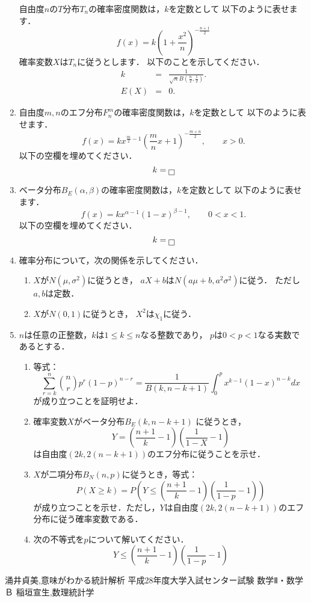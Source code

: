 \documentclass[12pt]{ltjsarticle}
\begin{document}
\begin{enumerate}
自由度$n$の$T$分布$T_n$の確率密度関数は，$k$を定数として
以下のように表せます．
\[
f\left(x\right)=k\left(1+\frac{x^2}{n}\right)^{-\frac{n+1}{2}}
\]
確率変数$X$は$T_n$に従うとします．
以下のことを示してください．
\begin{eqnarray*}
k&=&\frac{1}{\sqrt{n}B\left(\frac{n}{2},\frac{1}{2}\right)}. \\
E\left(X\right)&=&0.
\end{eqnarray*}
\item
自由度$m,n$のエフ分布$F_n^m$の確率密度関数は，$k$を定数として
以下のように表せます．
\[
f\left(x\right)=kx^{\frac{m}{2}-1}\left(\frac{m}{n}x+1\right)^{-\frac{m+n}{2}}
,\qquad
x>0.
\]
以下の空欄を埋めてください．
\[
k=\fbox{}
\]
\item
ベータ分布$B_E\left(\alpha,\beta\right)$の確率密度関数は，$k$を定数として
以下のように表せます．
\[
f\left(x\right)=kx^{\alpha-1}\left(1-x\right)^{\beta-1},\qquad
0<x<1.
\]
以下の空欄を埋めてください．
\[
k=\fbox{}
\]
\item
確率分布について，次の関係を示してください．
\begin{enumerate}
\item
$X$が$N\left(\mu,\sigma^2\right)$に従うとき，
$aX+b$は$N\left(a\mu+b,a^2\sigma^2\right)$に従う．
ただし$a,b$は定数．
\item
$X$が$N\left(0,1\right)$に従うとき，
$X^2$は$\chi_1$に従う．
\end{enumerate}
\item
$n$は任意の正整数，$k$は$1\le k\le n$なる整数であり，
$p$は$0<p<1$なる実数であるとする．
\begin{enumerate}
\item
等式：
\[
\sum_{r=k}^{n}\binom{n}{r}p^r\left(1-p\right)^{n-r}=
\frac{1}{B\left(k,n-k+1\right)}\int_0^p x^{k-1}\left(1-x\right)^{n-k}dx
\]
が成り立つことを証明せよ．
\cite[p.47]{inagaki}
\item
確率変数$X$がベータ分布$B_E\left(k,n-k+1\right)$
に従うとき，$$ Y=\left(\frac{n+1}{k}-1\right)\left(\frac{1}{1-X}-1\right)$$
は自由度$\left(2k,
2\left(n-k+1\right)\right)$のエフ分布に従うことを示せ．
\cite[p.106]{inagaki}
\item
$X$が二項分布$B_N\left(n,p\right)$に従うとき，等式：
\[
P\left(X \ge k\right)=
P\left(Y\le \left(\frac{n+1}{k}-1\right)\left(\frac{1}{1-p}-1\right)\right)
\]
が成り立つことを示せ．ただし，$Y$は自由度$\left(2k,
2\left(n-k+1\right)\right)$のエフ分布に従う確率変数である．
\cite[p.106]{inagaki}
\item
次の不等式を$p$について解いてください．
\[
Y\le \left(\frac{n+1}{k}-1\right)\left(\frac{1}{1-p}-1\right)
\]
\end{enumerate}
\end{enumerate}
\begin{thebibliography}{9}
 涌井貞美,意味がわかる統計解析
 平成28年度大学入試センター試験 数学Ⅱ・数学Ｂ
 稲垣宣生,数理統計学
\end{thebibliography}
\end{document}
